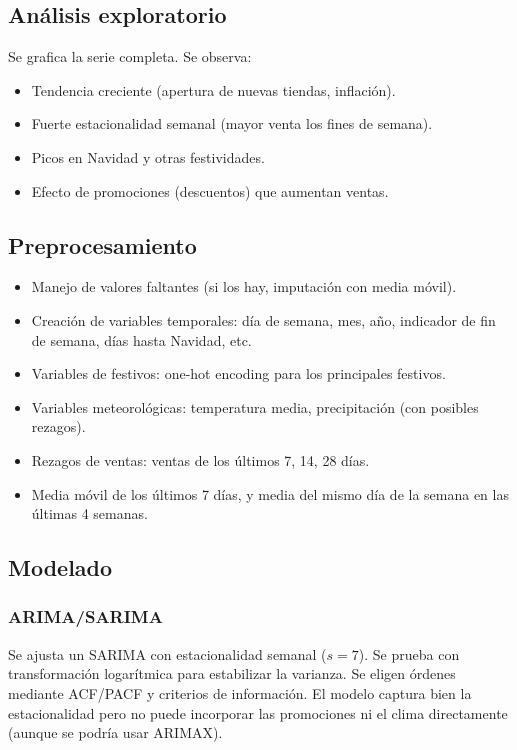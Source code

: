 \documentclass[12pt,a4paper,openany,oneside]{book}
\begin{document}
\subsection{Análisis exploratorio}
Se grafica la serie completa. Se observa:
\begin{itemize}
    \item Tendencia creciente (apertura de nuevas tiendas, inflación).
    \item Fuerte estacionalidad semanal (mayor venta los fines de semana).
    \item Picos en Navidad y otras festividades.
    \item Efecto de promociones (descuentos) que aumentan ventas.
\end{itemize}

\subsection{Preprocesamiento}
\begin{itemize}
    \item Manejo de valores faltantes (si los hay, imputación con media móvil).
    \item Creación de variables temporales: día de semana, mes, año, indicador de fin de semana, días hasta Navidad, etc.
    \item Variables de festivos: one-hot encoding para los principales festivos.
    \item Variables meteorológicas: temperatura media, precipitación (con posibles rezagos).
    \item Rezagos de ventas: ventas de los últimos 7, 14, 28 días.
    \item Media móvil de los últimos 7 días, y media del mismo día de la semana en las últimas 4 semanas.
\end{itemize}

\subsection{Modelado}

\subsubsection{ARIMA/SARIMA}
Se ajusta un SARIMA con estacionalidad semanal (\(s=7\)). Se prueba con transformación logarítmica para estabilizar la varianza. Se eligen órdenes mediante ACF/PACF y criterios de información. El modelo captura bien la estacionalidad pero no puede incorporar las promociones ni el clima directamente (aunque se podría usar ARIMAX).
\end{document}
